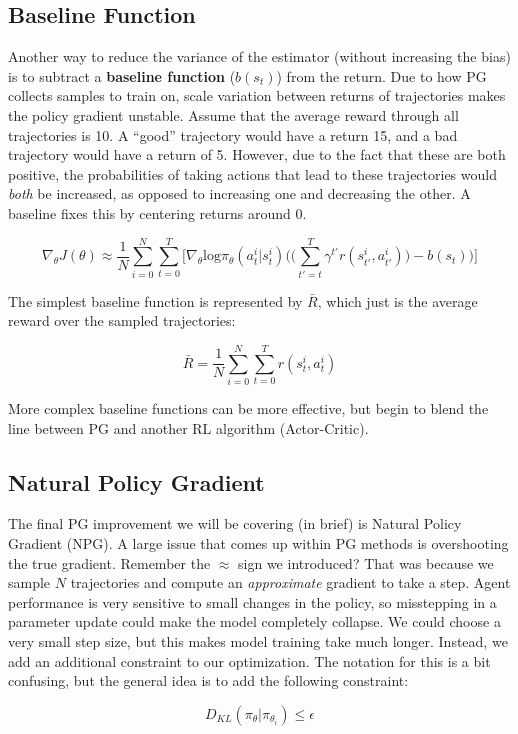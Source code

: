 \subsection{Baseline Function}
    \large Another way to reduce the variance of the estimator (without increasing the bias) is to subtract a \textbf{baseline function} ($b(s_t)$) from the return. Due to how PG collects samples to train on, scale variation between returns of trajectories makes the policy gradient unstable. Assume that the average reward through all trajectories is 10. A ``good'' trajectory would have a return 15, and a bad trajectory would have a return of 5. However, due to the fact that these are both positive, the probabilities of taking actions that lead to these trajectories would \textit{both} be increased, as opposed to increasing one and decreasing the other. A baseline fixes this by centering returns around 0.

    $$\nabla_\theta J(\theta) \approx \frac{1}{N}\sum_{i=0}^N\sum_{t=0}^T\biggl[ \nabla_\theta \mathrm{log}\pi_\theta(a_t^i|s_t^i)\biggl(\biggl(\sum_{t'=t}^T \gamma^{t'} r(s_{t'}^i, a_{t'}^i)\biggl) - b(s_t)\biggr)\biggr]$$

    The simplest baseline function is represented by $\bar{R}$, which just is the average reward over the sampled trajectories:

    $$\bar{R} = \frac{1}{N}\sum_{i=0}^N \sum_{t=0}^T r(s_t^i,a_t^i)$$

    More complex baseline functions can be more effective, but begin to blend the line between PG and another RL algorithm (Actor-Critic). 
\subsection{Natural Policy Gradient}
    \large The final PG improvement we will be covering (in brief) is Natural Policy Gradient (NPG). A large issue that comes up within PG methods is overshooting the true gradient. Remember the $\approx$ sign we introduced? That was because we sample $N$ trajectories and compute an \textit{approximate} gradient to take a step. Agent performance is very sensitive to small changes in the policy, so misstepping in a parameter update could make the model completely collapse. We could choose a very small step size, but this makes model training take much longer. Instead, we add an additional constraint to our optimization. The notation for this is a bit confusing, but the general idea is to add the following constraint:

    $$D_{KL}(\pi_\theta|\pi_{\theta_i}) \leq \epsilon$$

